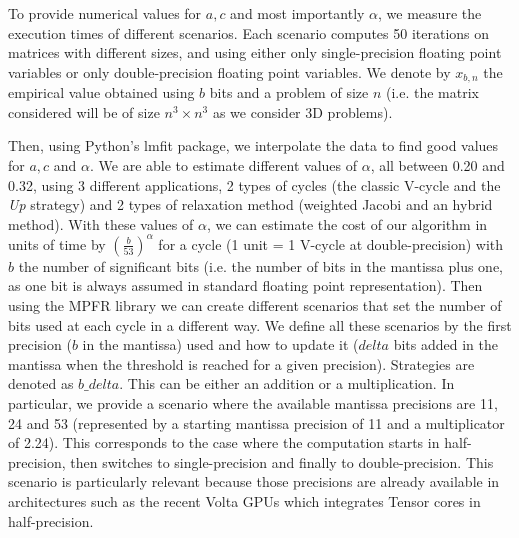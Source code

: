 To provide numerical values for $a,c$ and most importantly $\alpha$, we measure
the execution times of different scenarios. Each scenario computes 50
iterations on matrices with different sizes, and using either only
single-precision floating point variables or only double-precision floating
point variables. We denote by $x_{b,n}$ the empirical value obtained using $b$
bits and a problem of size $n$ (i.e. the matrix considered will be of size $n^3
\times n^3$ as we consider 3D problems).


Then, using Python's lmfit package, we interpolate the data to find good values
for $a,c$ and $\alpha$. We are able to estimate different values of $\alpha$,
all between 0.20 and 0.32, using 3 different applications, 2 types of cycles
(the classic V-cycle and the \emph{Up} strategy) and 2 types of relaxation
method (weighted Jacobi and an hybrid method). With these values of $\alpha$,
we can estimate the cost of our algorithm in units of time by
$\left(\frac{b}{53}\right)^\alpha$ for a cycle (1 unit = 1 V-cycle at
double-precision) with $b$ the number of significant bits (i.e. the number of
bits in the mantissa plus one, as one bit is always assumed in standard
floating point representation). Then using the MPFR library we can create
different scenarios that set the number of bits used at each cycle in a
different way. We define all these scenarios by the first precision ($b$ in the
mantissa) used and how to update it ($delta$ bits added in the mantissa when
the threshold is reached for a given precision). Strategies are denoted as
$b\_delta$. This can be either an addition or a multiplication. In particular,
we provide a scenario where the available mantissa precisions are 11, 24 and 53
(represented by a starting mantissa precision of 11 and a multiplicator of
2.24). This corresponds to the case where the computation starts in
half-precision, then switches to single-precision and finally to
double-precision. This scenario is particularly relevant because those
precisions are already available in architectures such as the recent Volta GPUs
which integrates Tensor cores in half-precision.

